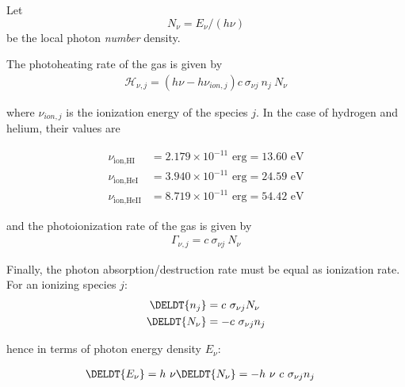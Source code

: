 Let
\begin{equation}
    N_\nu = E_\nu / (h \nu)
\end{equation}
be the local photon \emph{number} density.

The photoheating rate of the gas is given by
\begin{align}
\mathcal{H}_{\nu, j} = (h \nu - h \nu_{ion,j}) c \ \sigma_{\nu j} \ n_j \ N_\nu
\end{align}

where $\nu_{ion,j}$ is the ionization energy of the species $j$. In the case of
hydrogen and helium, their values are

\begin{align}
    \nu_{\text{ion,HI}} &= 2.179 \times 10^{-11} \text{ erg} = 13.60 \text{ eV}\\
    \nu_{\text{ion,HeI}} &= 3.940 \times 10^{-11} \text{ erg} = 24.59 \text{ eV}\\
    \nu_{\text{ion,HeII}} &= 8.719 \times 10^{-11} \text{ erg} = 54.42 \text{ eV}
\end{align}

and the photoionization rate of the gas is given by
\begin{align}
\Gamma_{\nu, j} = c \ \sigma_{\nu j} \ N_\nu
\end{align}



Finally, the photon absorption/destruction rate must be equal as ionization rate. For an ionizing species $j$:
%
\begin{align}
\DELDT{n_j} &= c \ \sigma_{\nu j}  N_\nu \\
\DELDT{N_\nu} &= -c \ \sigma_{\nu j} n_j
\end{align}

hence in terms of photon energy density $E_\nu$:

\begin{align}
\DELDT{E_\nu} &= h \ \nu \DELDT{N_\nu}  = -h\ \nu \ c \ \sigma_{\nu j} n_j
\end{align}

